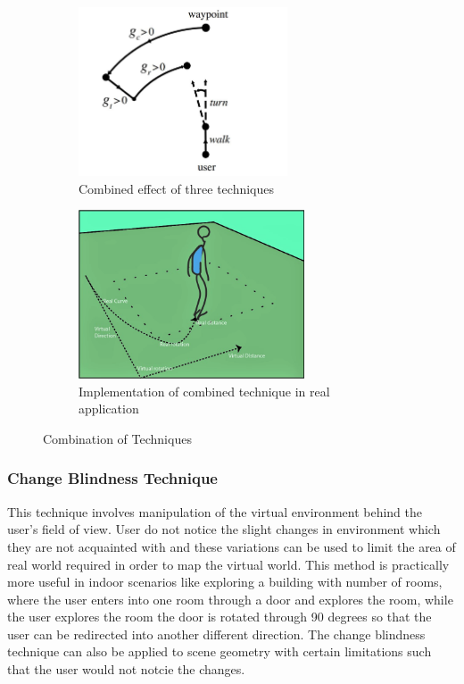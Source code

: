 \documentclass[12pt]{article}
\begin{document}
\begin{figure}[!ht]
\begin{subfigure}{0.5\textwidth}
\includegraphics[width=0.9\linewidth, height=5cm]{comb} 
\caption{Combined effect of three techniques }
\label{(a)}
\end{subfigure}
\begin{subfigure}{0.5\textwidth}
\includegraphics[width=0.9\linewidth, height=5cm]{translation2}
\caption{Implementation of combined technique in real application}
\label{(b)}
\end{subfigure}
\caption{Combination of Techniques}
\end{figure}
\clearpage



\subsubsection{Change Blindness Technique}
This technique involves manipulation of the virtual environment behind the user's field of view. User do not notice the slight changes in environment which they are not acquainted with and these variations can be used to limit the area of real world required in order to map the virtual world. This method is practically more useful in indoor scenarios like exploring a building with number of rooms, where the user enters into one room through a door and explores the room, while the user explores the room the door is rotated through 90 degrees so that the user can be redirected into another different direction. The change blindness technique can also be applied to scene geometry with certain limitations such that the user would not notcie the changes. 
\end{document}

